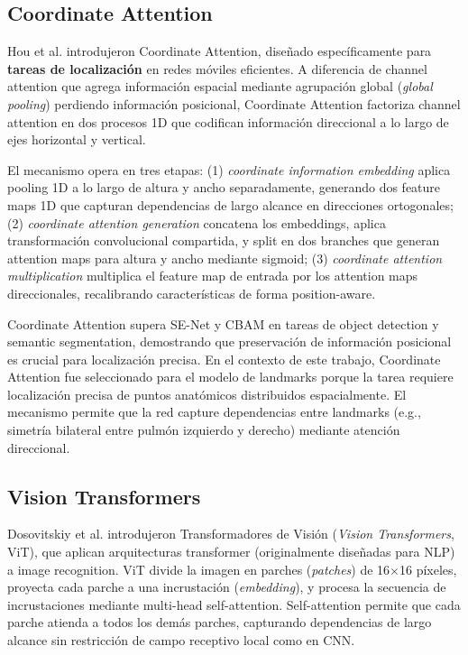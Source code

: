\subsection{Coordinate Attention}

Hou et al. \cite{hou2021coordinate} introdujeron Coordinate Attention, diseñado específicamente para \textbf{tareas de localización} en redes móviles eficientes. A diferencia de channel attention que agrega información espacial mediante agrupación global (\textit{global pooling}) perdiendo información posicional, Coordinate Attention factoriza channel attention en dos procesos 1D que codifican información direccional a lo largo de ejes horizontal y vertical.

El mecanismo opera en tres etapas: (1) \textit{coordinate information embedding} aplica pooling 1D a lo largo de altura y ancho separadamente, generando dos feature maps 1D que capturan dependencias de largo alcance en direcciones ortogonales; (2) \textit{coordinate attention generation} concatena los embeddings, aplica transformación convolucional compartida, y split en dos branches que generan attention maps para altura y ancho mediante sigmoid; (3) \textit{coordinate attention multiplication} multiplica el feature map de entrada por los attention maps direccionales, recalibrando características de forma position-aware.

Coordinate Attention supera SE-Net y CBAM en tareas de object detection y semantic segmentation, demostrando que preservación de información posicional es crucial para localización precisa. En el contexto de este trabajo, Coordinate Attention fue seleccionado para el modelo de landmarks porque la tarea requiere localización precisa de puntos anatómicos distribuidos espacialmente. El mecanismo permite que la red capture dependencias entre landmarks (e.g., simetría bilateral entre pulmón izquierdo y derecho) mediante atención direccional.

\subsection{Vision Transformers}

Dosovitskiy et al. \cite{dosovitskiy2020image} introdujeron Transformadores de Visión (\textit{Vision Transformers}, ViT), que aplican arquitecturas transformer (originalmente diseñadas para NLP) a image recognition. ViT divide la imagen en parches (\textit{patches}) de 16$\times$16 píxeles, proyecta cada parche a una incrustación (\textit{embedding}), y procesa la secuencia de incrustaciones mediante multi-head self-attention. Self-attention permite que cada parche atienda a todos los demás parches, capturando dependencias de largo alcance sin restricción de campo receptivo local como en CNN.

